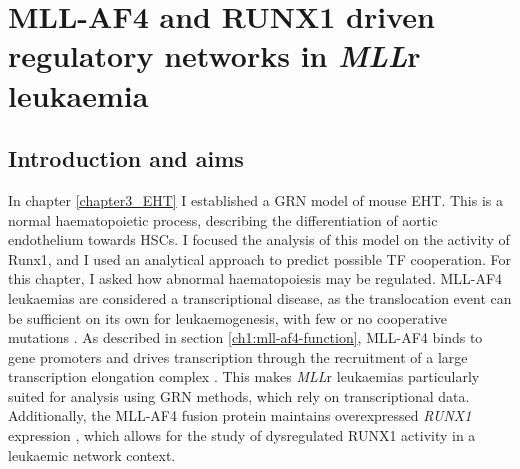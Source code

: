 
\chapter{\label{chapter4_MA4}MLL-AF4 and RUNX1 driven regulatory networks in \textit{MLL}r leukaemia}

\begingroup
\raggedright
\minitoc
\endgroup

\clearpage %


\section{Introduction and aims}

In chapter \ref{chapter3_EHT} I established a GRN model of mouse EHT. This is a normal haematopoietic process, describing the differentiation of aortic endothelium towards HSCs. I focused the analysis of this model on the activity of Runx1, and I used an analytical approach to predict possible TF cooperation. For this chapter, I asked how abnormal haematopoiesis may be regulated. MLL-AF4 leukaemias are considered a transcriptional disease, as the translocation event can be sufficient on its own for leukaemogenesis, with few or no cooperative mutations \citep{bardini_dna_2010, bardini_implementation_2011, the_cancer_genome_atlas_research_network_genomic_2013, andersson_landscape_2015}. As described in section \ref{ch1:mll-af4-function}, MLL-AF4 binds to gene promoters and drives transcription through the recruitment of a large transcription elongation complex \citep{ballabio_molecular_2012, slany_mll_2020}. This makes \textit{MLL}r leukaemias particularly suited for analysis using GRN methods, which rely on transcriptional data. Additionally, the MLL-AF4 fusion protein maintains overexpressed \textit{RUNX1} expression \citep{wilkinson_runx1_2013}, which allows for the study of dysregulated RUNX1 activity in a leukaemic network context.

